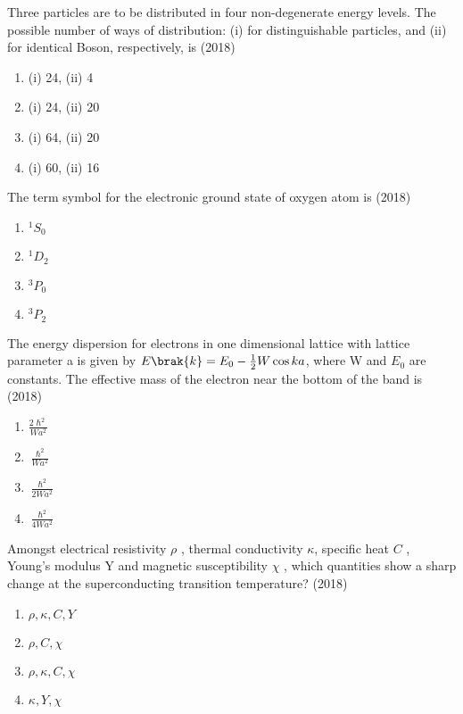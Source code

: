     \item Three particles are to be distributed in four non-degenerate energy levels. The possible
    number of ways of distribution: (i) for distinguishable particles, and (ii) for identical
    Boson, respectively, is \hfill (2018)
    \begin{enumerate}[label = (\Alph*)]
        \item  (i) 24, (ii) 4 
        \item  (i) 24, (ii) 20 
        \item  (i) 64, (ii) 20 
        \item  (i) 60, (ii) 16
    \end{enumerate}
    \item The term symbol for the electronic ground state of oxygen atom is    \hfill (2018)
    \begin{enumerate}[label=(\Alph*)]
        \item $^1S_0$
        \item $^1D_2$
        \item $^3P_0$
        \item $^3P_2$
    \end{enumerate}
    \item The energy dispersion for electrons in one dimensional lattice with lattice parameter a is
    given by $E\brak{k} = E_0-\frac{1}{2}W\cos ka$, where W and $E_0$ are constants. The effective mass of
    the electron near the bottom of the band is \hfill (2018)
    \begin{enumerate}[label=(\Alph*)]
        \item $\frac{2\hslash^2}{Wa^2}$
        \item $\frac{\hslash^2}{Wa^2}$
        \item $\frac{\hslash^2}{2Wa^2}$
        \item $\frac{\hslash^2}{4Wa^2}$
    \end{enumerate}
    \item Amongst electrical resistivity $\rho$ , thermal conductivity $\kappa$, specific heat $C$ , Young’s
    modulus Y  and magnetic susceptibility $\chi$ , which quantities show a sharp change at
    the superconducting transition temperature?  \hfill (2018)
    \begin{enumerate} [label = (\Alph*)]
     \item $\rho, \kappa, C,Y$ 
     \item $\rho,C,\chi$
     \item $\rho, \kappa, C,\chi$
     \item $\kappa,Y,\chi$ 
    \end{enumerate}
